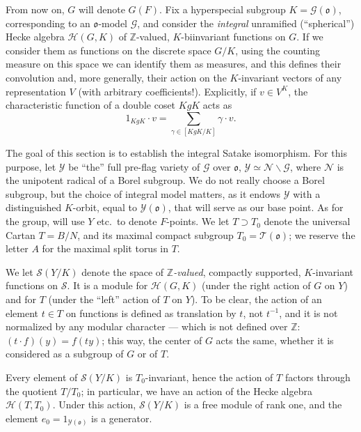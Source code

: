 From now on, $G$ will denote $G(F)$. 
Fix a hyperspecial subgroup $K = \mathcal G(\mathfrak o)$, corresponding to an $\mathfrak o$-model $\mathcal G$, and consider the \emph{integral} unramified (``spherical'') Hecke algebra $\mathcal H(G,K)$ of $\mathbb Z$-valued, $K$-biinvariant functions on $G$. If we consider them as functions on the discrete space $G/K$, using the counting measure on this space we can identify them as measures, and this defines their convolution and, more generally, their action on the $K$-invariant vectors of any representation $V$ (with arbitrary coefficients!). Explicitly, if $v\in V^K$, the characteristic function of a double coset $KgK$ acts as 
$$ 1_{KgK}\cdot v = \sum_{\gamma \in [KgK/K]} \gamma\cdot v.$$

The goal of this section is to establish the integral Satake isomorphism. For this purpose, let $\mathcal Y$ be ``the'' full pre-flag variety of $\mathcal G$ over $\mathfrak o$, $\mathcal Y \simeq \mathcal N\backslash \mathcal G$, where $\mathcal N$ is the unipotent radical of a Borel subgroup. We do not really choose a Borel subgroup, but the choice of integral model matters, as it endows $\mathcal Y$ with a distinguished $K$-orbit, equal to $\mathcal Y(\mathfrak o)$, that will serve as our base point. As for the group, will use $Y$ etc.\ to denote $F$-points. We let $T\supset T_0$ denote the universal Cartan $T=B/N$, and its maximal compact subgroup $T_0=\mathcal T(\mathfrak o)$; we reserve the letter $A$ for the maximal split torus in $T$. 

We let $\mathcal S(Y/K)$ denote the space of \emph{$\mathbb Z$-valued}, compactly supported, $K$-invariant functions on $\mathcal S$. It is a module for $\mathcal H(G,K)$ (under the right action of $G$ on $Y$) and for $T$ (under the ``left'' action of $T$ on $Y$). To be clear, the action of an element $t\in T$ on functions is defined as translation by $t$, not $t^{-1}$, and it is not normalized by any modular character --- which is not defined over $\mathbb Z$: $(t\cdot f)(y) = f(ty)$; this way, the center of $G$ acts the same, whether it is considered as a subgroup of $G$ or of $T$.


\begin{lemma}
 \label{lemma-torus-module}
 Every element of $\mathcal S(Y/K)$ is $T_0$-invariant, hence the action of $T$ factors through the quotient $T/T_0$; in particular, we have an action of the Hecke algebra $\mathcal H(T,T_0)$. Under this action, $\mathcal S(Y/K)$ is a free module of rank one, and the element $e_0 = 1_{\mathcal Y(\mathfrak o)}$ is a generator.
\end{lemma}

